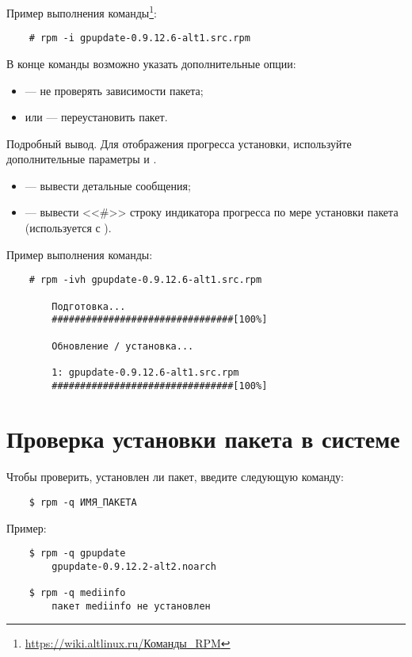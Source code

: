 
Пример выполнения команды\footnote{\href{https://wiki.altlinux.ru/\%D0\%9A\%D0\%BE\%D0\%BC\%D0\%B0\%D0\%BD\%D0\%B4\%D1\%8B_RPM}{https://wiki.altlinux.ru/Команды\_RPM}}:

\begin{verbatim}
    # rpm -i gpupdate-0.9.12.6-alt1.src.rpm
\end{verbatim}

В конце команды возможно указать дополнительные опции:
\begin{itemize}
	\item {} --- не проверять зависимости пакета;
	\item {} или  --- переустановить пакет.
\end{itemize}

Подробный вывод.
Для отображения прогресса установки, используйте дополнительные параметры  и .
\begin{itemize}
	\item {} --- вывести детальные сообщения;
	\item {} --- вывести <<\#>> строку индикатора прогресса по мере установки пакета (используется с ).
\end{itemize}

Пример выполнения команды:
\begin{verbatim}
    # rpm -ivh gpupdate-0.9.12.6-alt1.src.rpm

        Подготовка...
        ################################[100%]

        Обновление / установка...

        1: gpupdate-0.9.12.6-alt1.src.rpm
        ################################[100%]
\end{verbatim}


\section{Проверка установки пакета в системе}\label{verifying-package}
Чтобы проверить, установлен ли пакет, введите следующую команду:
\begin{verbatim}
    $ rpm -q ИМЯ_ПАКЕТА
\end{verbatim}

Пример:
\begin{verbatim}
    $ rpm -q gpupdate
        gpupdate-0.9.12.2-alt2.noarch

    $ rpm -q mediinfo
        пакет mediinfo не установлен
\end{verbatim}

